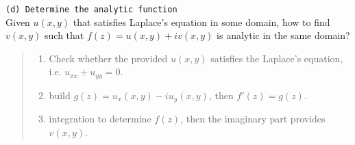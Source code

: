 \verb|(d) Determine the analytic function|
\\
Given $u(x,y)$ that satisfies Laplace's equation in some domain, how to find $v(x,y)$ such that $f(z) = u(x,y) + iv(x,y)$ is analytic in the same domain?

\begin{quote}
\begin{enumerate}
\item Check whether the provided $u(x,y)$ satisfies the Laplace's equation, i.e. $u_{xx}+u_{yy}=0$.
\item build $g(z) = u_x(x,y) - iu_y(x,y)$, then $f'(z) = g(z)$.
\item integration to determine $f(z)$, then the imaginary part provides $v(x,y)$.
\end{enumerate}
\end{quote}